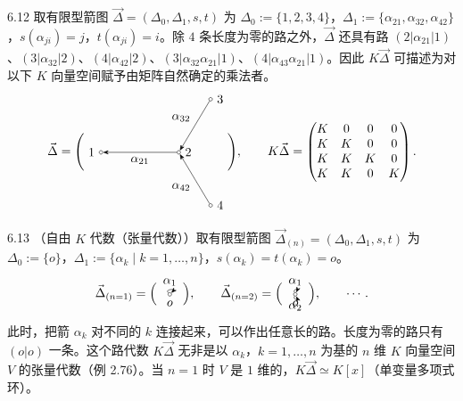 \begin{example}{6.12}
取有限型箭图 $\vec{\Delta}=(\Delta_0,\Delta_1,s,t)$ 为 $\Delta_0:=\{1,2,3,4\}$，$\Delta_1:=\{\alpha_{21},\alpha_{32},\alpha_{42}\}$，$s(\alpha_{ji})=j$，$t(\alpha_{ji})=i$。除 $4$ 条长度为零的路之外，$\vec{\Delta}$ 还具有路 $(2|\alpha_{21}|1)$、$(3|\alpha_{32}|2)$、$(4|\alpha_{42}|2)$、$(3|\alpha_{32}\alpha_{21}|1)$、$(4|\alpha_{43}\alpha_{21}|1)$。因此 $K\vec{\Delta}$ 可描述为对以下 $K$ 向量空间赋予由矩阵自然确定的乘法者。
\[
\vec{\Delta} =
\Biggl(
\begin{tikzpicture}[baseline=-0.5ex]
  \node[draw,circle,inner sep=1pt,label=left:{$1$}] (v1) at (0,0) {};
  \node[draw,circle,inner sep=1pt,label=right:{$2$}] (v2) at (2.2,0) {};
  \node[draw,circle,inner sep=1pt,label=right:{$3$}] (v3) at (3.1,1.5) {};
  \node[draw,circle,inner sep=1pt,label=right:{$4$}] (v4) at (3.1,-1.5) {};
  \draw[-{Stealth}] (v2) -- node[below]{$\alpha_{21}$} (v1);
  \draw[-{Stealth}] (v3) -- node[above left]{$\alpha_{32}$} (v2);
  \draw[-{Stealth}] (v4) -- node[below left]{$\alpha_{42}$} (v2);
\end{tikzpicture}
\Biggr),
\qquad
K\vec{\Delta} =
\begin{pmatrix}
K & 0 & 0 & 0\\
K & K & 0 & 0\\
K & K & K & 0\\
K & K & 0 & K
\end{pmatrix}.
\]

\end{example}

\begin{example}{6.13}
（自由 $K$ 代数（张量代数））取有限型箭图 $\vec{\Delta}_{(n)}=(\Delta_0,\Delta_1,s,t)$ 为 $\Delta_0:=\{o\}$，$\Delta_1:=\{\alpha_k\mid k=1,\dots,n\}$，$s(\alpha_k)=t(\alpha_k)=o$。
\[
\vec{\Delta}_{(n=1)}=\Bigl(\,
\begin{tikzpicture}[baseline=-0.5ex]
  \node[draw,circle,inner sep=1pt,label=below:{$o$}] (o) at (0,0) {};
  \draw[-{Stealth}] (o) to[out=135,in=45,looseness=5] node[above]{$\alpha_1$} (o);
\end{tikzpicture}
\,\Bigr),\qquad
\vec{\Delta}_{(n=2)}=\Bigl(\,
\begin{tikzpicture}[baseline=-0.5ex]
  \node[draw,circle,inner sep=1pt,label=below:{$o$}] (o) at (0,0) {};
  \draw[-{Stealth}] (o) to[out=115,in=65,looseness=6] node[above]{$\alpha_1$} (o);
  \draw[-{Stealth}] (o) to[out=245,in=295,looseness=6] node[below]{$\alpha_2$} (o);
\end{tikzpicture}
\,\Bigr),\qquad\cdots.
\]
此时，把箭 $\alpha_k$ 对不同的 $k$ 连接起来，可以作出任意长的路。长度为零的路只有 $(o|o)$ 一条。这个路代数 $K\vec{\Delta}$ 无非是以 $\alpha_k$，$k=1,\dots,n$ 为基的 $n$ 维 $K$ 向量空间 $V$ 的张量代数（例 2.76）。当 $n=1$ 时 $V$ 是 $1$ 维的，$K\vec{\Delta}\simeq K[x]$（单变量多项式环）。
\end{example}

